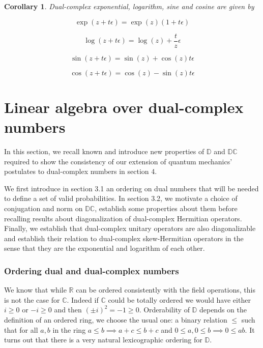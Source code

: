 \documentclass{article}
\newtheorem{corollary}[theorem]{Corollary}
\newcommand{\R}{\mathbb{R}}
\newcommand{\C}{\mathbb{C}}
\newcommand{\D}{\mathbb{D}}
\newcommand{\DC}{\mathbb{DC}}
\newcommand{\e}{\epsilon}
\begin{document}
\begin{corollary}\label{corr:elsc} Dual-complex exponential, logarithm, sine and cosine are given by

\begin{multicols}{2}
\noindent \begin{equation}\label{eq:expscalar}
 \exp(z + t\e) = \exp(z)(1 + t\e)
\end{equation}

\noindent \begin{equation}
 \log(z + t\e) = \log(z) + \frac t z \e
\end{equation}

\columnbreak
\noindent \begin{equation}
 \sin(z + t\e) = \sin(z) + \cos(z)t\e
\end{equation}

\noindent \begin{equation}
 \cos(z + t\e) = \cos(z) - \sin(z)t\e
\end{equation}
\end{multicols}
\end{corollary}

\section{Linear algebra over dual-complex numbers}

In this section, we recall known and introduce new properties of $\D$ and $\DC$ required to show the consistency of our extension of quantum mechanics' postulates to dual-complex numbers in section 4.

We first introduce in section 3.1 an ordering on dual numbers that will be needed to define a set of valid probabilities. In section 3.2, we motivate a choice of conjugation and norm on $\DC$, establish some properties about them before recalling results about diagonalization of dual-complex Hermitian operators. Finally, we establish that dual-complex unitary operators are also diagonalizable and establish their relation to dual-complex skew-Hermitian operators in the sense that they are the exponential and logarithm of each other.

\subsubsection*{Ordering dual and dual-complex numbers}

We know that while $\R$ can be ordered consistently with the field operations, this is not the case for $\C$. Indeed if $\C$ could be totally ordered we would have either $i \geq 0$ or $-i \geq 0$ and then $(\pm i)^2 = -1 \geq 0$. Orderability of $\D$ depends on the definition of an ordered ring, we choose the usual one: a binary relation $\leq$ such that for all $a, b$ in the ring $a \leq b \implies a + c \leq b + c$ and $0 \leq a, 0 \leq b \implies 0 \leq ab$. \cite{fuchs1963} It turns out that there is a very natural lexicographic ordering for $\D$.
\end{document}
